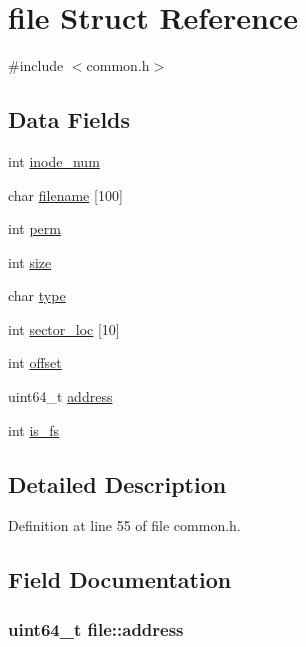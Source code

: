 \hypertarget{structfile}{}\section{file Struct Reference}
\label{structfile}


{\ttfamily \#include $<$common.\+h$>$}

\subsection*{Data Fields}
\begin{DoxyCompactItemize}
\item 
int \hyperlink{structfile_a3786bd6e6b62b6a56d906c4ab40f0648}{inode\+\_\+num}
\item 
char \hyperlink{structfile_ad45e3551765b38ecf4598ee9b06c796f}{filename} \mbox{[}100\mbox{]}
\item 
int \hyperlink{structfile_ad094e8384225dee8ae9b4258745c30f9}{perm}
\item 
int \hyperlink{structfile_a83a90719edeee627bd6fefe5f8af58ce}{size}
\item 
char \hyperlink{structfile_a814f6220d71e264dc20aaaec301d99e7}{type}
\item 
int \hyperlink{structfile_ab4368e129b54f18c028265ad49779e04}{sector\+\_\+loc} \mbox{[}10\mbox{]}
\item 
int \hyperlink{structfile_ad056d2081f3cab9ed4668689a02acaaf}{offset}
\item 
uint64\+\_\+t \hyperlink{structfile_afc95f13cca3cd7a46d733717a5f4a6ed}{address}
\item 
int \hyperlink{structfile_a3161116c6ac521cfa3514f02c88b8d65}{is\+\_\+fs}
\end{DoxyCompactItemize}


\subsection{Detailed Description}


Definition at line 55 of file common.\+h.



\subsection{Field Documentation}
\subsubsection[{\texorpdfstring{address}{address}}]{\setlength{\rightskip}{0pt plus 5cm}uint64\+\_\+t file\+::address}\hypertarget{structfile_afc95f13cca3cd7a46d733717a5f4a6ed}{}\label{structfile_afc95f13cca3cd7a46d733717a5f4a6ed}


